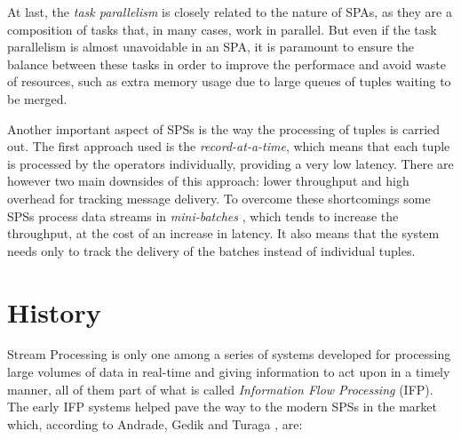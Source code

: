 \documentclass[ppgc,diss,english]{iiufrgs}
\begin{document}
At last, the \emph{task parallelism} is closely related to the nature of SPAs, as they are a composition of tasks that, in many cases, work in parallel. But even if the task parallelism is almost unavoidable in an SPA, it is paramount to ensure the balance between these tasks in order to improve the performace and avoid waste of resources, such as extra memory usage due to large queues of tuples waiting to be merged.


Another important aspect of SPSs is the way the processing of tuples is carried out. The first approach used is the \emph{record-at-a-time}, which means that each tuple is processed by the operators individually, providing a very low latency. There are however two main downsides of this approach: lower throughput and high overhead for tracking message delivery. To overcome these shortcomings some SPSs process data streams in \emph{mini-batches} \cite{muralidharan2014fault}, which tends to increase the throughput, at the cost of an increase in latency. It also means that the system needs only to track the delivery of the batches instead of individual tuples.


\section{History}
\label{sec:esp:history}

Stream Processing is only one among a series of systems developed for processing large volumes of data in real-time and giving information to act upon in a timely manner, all of them part of what is called \emph{Information Flow Processing} (IFP). The early IFP systems helped pave the way to the modern SPSs in the market which, according to Andrade, Gedik and Turaga \cite{andrade2014fundamentals}, are: 

\end{document}
